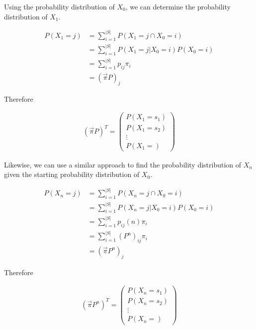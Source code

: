 \documentclass[a4paper,12pt]{article}
\theoremstyle{definition}
\begin{document}
Using the probability distribution of $X_0$, we can determine the probability distribution of $X_1$.

	\begin{equation*}
	\begin{aligned}
		P(X_1 = j) &= \sum_{i=1}^{|S|} P(X_1 = j \cap X_0 = i) \\
				 	 &= \sum_{i=1}^{|S|} P(X_1 = j | X_0 = i)P(X_0 = i) \\
			     	 &= \sum_{i=1}^{|S|} p_{ij}\pi_i \\
			     	 &= (\vec{\pi}P)_j
	\end{aligned}
	\end{equation*}	
			     	 
	Therefore
	
	\begin{equation*}
	\begin{aligned}
		 (\vec{\pi}P)^T =
		 \begin{pmatrix}
		 P(X_1 = s_1) \\
		 P(X_1 = s_2) \\ 
		 \vdots \\
		 P(X_1 =)
		 \end{pmatrix}
	\end{aligned}
	\end{equation*}
	
Likewise, we can use a similar approach to find the probability distribution of $X_n$ given the starting probability distribution of $X_0$. 

	\begin{equation*}
	\begin{aligned}
		P(X_n = j) &= \sum_{i=1}^{|S|} P(X_n = j \cap X_0 = i) \\
				 	 &= \sum_{i=1}^{|S|} P(X_n = j | X_0 = i)P(X_0 = i) \\
			     	 &= \sum_{i=1}^{|S|} p_{ij}(n)\pi_i \\
			     	 &= \sum_{i=1}^{|S|} (P^n)_{ij}\pi_i \\
			     	 &= (\vec{\pi}P^n)_j
	\end{aligned}
	\end{equation*}	
	
	Therefore
	
	\begin{equation*}
	\begin{aligned}
		 (\vec{\pi}P^n)^T =
		 \begin{pmatrix}
		 P(X_n = s_1) \\
		 P(X_n = s_2) \\ 
		 \vdots \\
		 P(X_n =)
		 \end{pmatrix}
	\end{aligned}
	\end{equation*}
	
\end{document}

